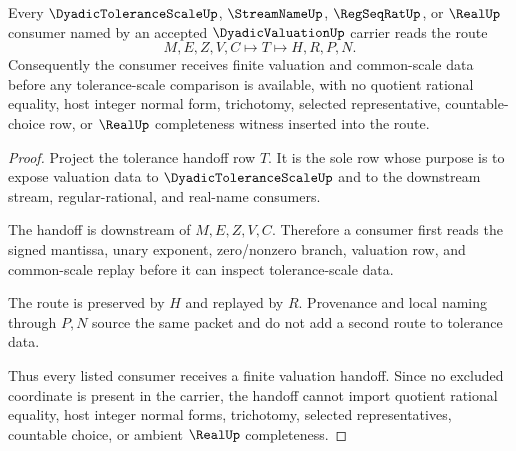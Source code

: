 \begin{theorem}
\label{thm:dyadic-valuation-tolerance-handoff}
Every $\DyadicToleranceScaleUp$, $\StreamNameUp$, $\RegSeqRatUp$, or $\RealUp$ consumer named by an accepted $\DyadicValuationUp$ carrier reads the route
$$
M,E,Z,V,C \longmapsto T \longmapsto H,R,P,N .
$$
Consequently the consumer receives finite valuation and common-scale data before any tolerance-scale comparison is available, with no quotient rational equality, host integer normal form, trichotomy, selected representative, countable-choice row, or $\RealUp$ completeness witness inserted into the route.
\end{theorem}
\begin{proof}
Project the tolerance handoff row $T$. It is the sole row whose purpose is to expose valuation data to $\DyadicToleranceScaleUp$ and to the downstream stream, regular-rational, and real-name consumers.

The handoff is downstream of $M,E,Z,V,C$. Therefore a consumer first reads the signed mantissa, unary exponent, zero/nonzero branch, valuation row, and common-scale replay before it can inspect tolerance-scale data.

The route is preserved by $H$ and replayed by $R$. Provenance and local naming through $P,N$ source the same packet and do not add a second route to tolerance data.

Thus every listed consumer receives a finite valuation handoff. Since no excluded coordinate is present in the carrier, the handoff cannot import quotient rational equality, host integer normal forms, trichotomy, selected representatives, countable choice, or ambient $\RealUp$ completeness.
\end{proof}


